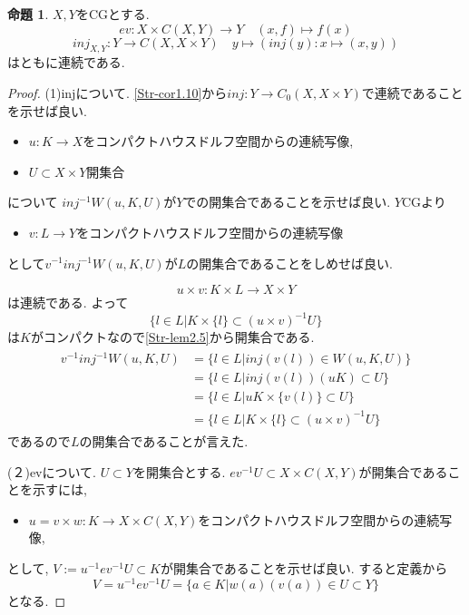 \documentclass[dvipdfmx,a4paper,11pt]{article}
\theoremstyle{definition}
\newtheorem{prop}[thm]{命題}
\begin{document}
 \begin{tcolorbox}
 [colback = white, colframe = green!35!black, fonttitle = \bfseries,breakable = true]
\begin{prop}\cite[Prop2.１１]{Str}
\label{Str-prop2.11}
$X,Y$をCGとする. 
$$
ev: X \times  C(X,Y) \to Y \quad (x,f) \mapsto f(x)
$$
$$
inj_{X,Y}: Y \to C(X,X \times Y) \quad y \mapsto (inj(y) : x \mapsto (x,y))
$$
はともに連続である. 
\end{prop}
\end{tcolorbox}

\begin{proof}
(1)injについて. 
\ref{Str-cor1.10}から$inj : Y \to C_0(X,X \times Y)$で連続であることを示せば良い.
\begin{itemize}
\item $u : K \to X$をコンパクトハウスドルフ空間からの連続写像, 
\item $U \subset X \times Y$開集合
\end{itemize}
について
$inj^{-1}W(u,K,U)$が$Y$での開集合であることを示せば良い.
$Y$CGより
\begin{itemize}
\item $v : L \to Y$をコンパクトハウスドルフ空間からの連続写像
\end{itemize}
として$v^{-1} inj^{-1}W(u,K,U)$が$L$の開集合であることをしめせば良い.

$$
u \times v : K \times L \to X \times Y
$$
は連続である. よって
$$ \{ l \in L | K \times \{ l\} \subset (u \times v)^{-1}U \}
$$
は$K$がコンパクトなので\ref{Str-lem2.5}から開集合である. 
\begin{align*}
\begin{split}
v^{-1} inj^{-1}W(u,K,U)
&=\{ l \in L | inj(v(l)) \in W(u,K,U) \} \\
&= \{ l \in L | inj(v(l)) (uK) \subset U \} \\
&=\{ l \in L |  uK \times \{v(l) \}\subset U\}\\
&= \{ l \in L | K \times \{ l\} \subset (u \times v)^{-1}U \}
\end{split}
\end{align*}
であるので$L$の開集合であることが言えた. 

(２)evについて.
 $U \subset Y$を開集合とする.
 $ev^{-1}U \subset X \times C(X,Y)$が開集合であることを示すには, 
 \begin{itemize}
\item $u=v\times w : K \to X \times C(X,Y)$をコンパクトハウスドルフ空間からの連続写像, 
\end{itemize}
 として,  $V:=u^{-1}ev^{-1}U \subset K$が開集合であることを示せば良い.
 すると定義から
 $$
V= u^{-1}ev^{-1}U 
=\{a \in K | w(a)(v(a))  \in U \subset Y\}
 $$
 となる. 
 

\end{proof}
\end{document}
